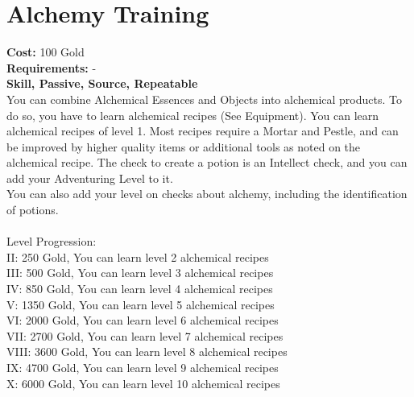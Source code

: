 \section{Alchemy Training}
\textbf{Cost:} 100 Gold\\
\textbf{Requirements:} -\\
\textbf{Skill, Passive, Source, Repeatable}\\
You can combine Alchemical Essences and Objects into alchemical products. To do so, you have to learn alchemical recipes (See Equipment). You can learn alchemical recipes of level 1. Most recipes require a Mortar and Pestle, and can be improved by higher quality items or additional tools as noted on the alchemical recipe. The check to create a potion is an Intellect check, and you can add your Adventuring Level to it.\\
You can also add your level on checks about alchemy, including the identification of potions.\\
\\
Level Progression:\\
II: 250 Gold, You can learn level 2 alchemical recipes\\
III: 500 Gold, You can learn level 3 alchemical recipes\\
IV: 850 Gold, You can learn level 4 alchemical recipes\\
V: 1350 Gold, You can learn level 5 alchemical recipes\\
VI: 2000 Gold, You can learn level 6 alchemical recipes\\
VII: 2700 Gold, You can learn level 7 alchemical recipes\\
VIII: 3600 Gold, You can learn level 8 alchemical recipes\\
IX: 4700 Gold, You can learn level 9 alchemical recipes\\
X: 6000 Gold, You can learn level 10 alchemical recipes\\